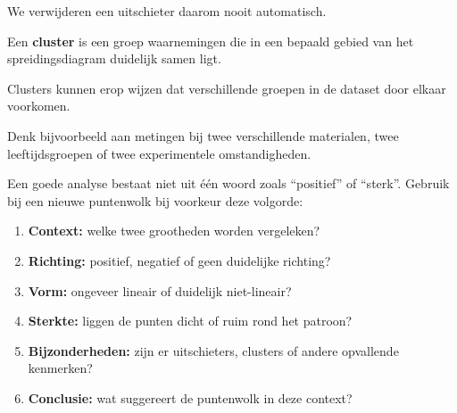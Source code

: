 \documentclass{ximera}
\begin{document}
We verwijderen een uitschieter daarom nooit automatisch.

\begin{definitie}
Een \textbf{cluster} is een groep waarnemingen die in een bepaald
gebied van het spreidingsdiagram duidelijk samen ligt.
\end{definitie}

Clusters kunnen erop wijzen dat verschillende groepen in de dataset
door elkaar voorkomen.

Denk bijvoorbeeld aan metingen bij twee verschillende materialen,
twee leeftijdsgroepen of twee experimentele omstandigheden.



Een goede analyse bestaat niet uit één woord zoals ``positief'' of
``sterk''. Gebruik bij een nieuwe puntenwolk bij voorkeur deze volgorde:

\begin{enumerate}
  \item \textbf{Context:} welke twee grootheden worden vergeleken?
  \item \textbf{Richting:} positief, negatief of geen duidelijke richting?
  \item \textbf{Vorm:} ongeveer lineair of duidelijk niet-lineair?
  \item \textbf{Sterkte:} liggen de punten dicht of ruim rond het patroon?
  \item \textbf{Bijzonderheden:} zijn er uitschieters, clusters of andere opvallende kenmerken?
  \item \textbf{Conclusie:} wat suggereert de puntenwolk in deze context?
\end{enumerate}
\end{document}
